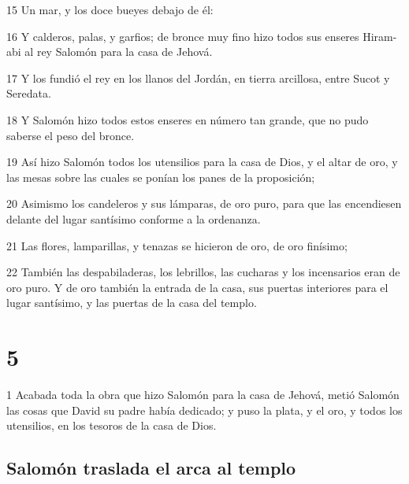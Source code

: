 \par 15 Un mar, y los doce bueyes debajo de él:
\par 16  Y calderos, palas, y garfios; de bronce muy fino hizo todos sus enseres Hiram-abi al rey Salomón para la casa de Jehová.
\par 17 Y los fundió el rey en los llanos del Jordán, en tierra arcillosa, entre Sucot y Seredata.
\par 18 Y Salomón hizo todos estos enseres en número tan grande, que no pudo saberse el peso del bronce.
\par 19 Así hizo Salomón todos los utensilios para la casa de Dios, y el altar de oro, y las mesas sobre las cuales se ponían los panes de la proposición;
\par 20 Asimismo los candeleros y sus lámparas, de oro puro, para que las encendiesen delante del lugar santísimo conforme a la ordenanza.
\par 21 Las flores, lamparillas, y tenazas se hicieron de oro, de oro finísimo;
\par 22 También las despabiladeras, los lebrillos, las cucharas y los incensarios eran de oro puro. Y de oro también la entrada de la casa, sus puertas interiores para el lugar santísimo, y las puertas de la casa del templo.

\chapter{5}

\par 1 Acabada toda la obra que hizo Salomón para la casa de Jehová, metió Salomón las cosas que David su padre había dedicado; y puso la plata, y el oro, y todos los utensilios, en los tesoros de la casa de Dios.

\section*{Salomón traslada el arca al templo}

